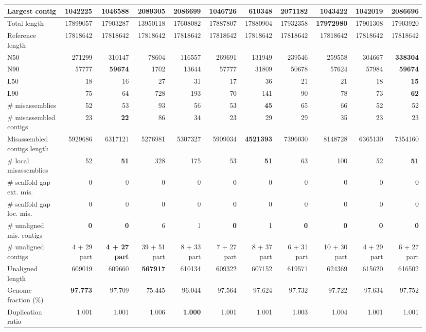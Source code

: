 \documentclass[12pt,a4paper]{article}
\begin{document}
\begin{table}[ht]
\begin{center}
\begin{tabular}{|l*{10}{|r}|}
Largest contig & 1042225 & 1046588 & {\bf 2089305} & 2086699 & 1046726 & 610348 & 2071182 & 1043422 & 1042019 & 2086696 \\ \hline
Total length & 17899057 & 17903287 & 13950118 & 17608082 & 17887807 & 17880904 & 17932358 & {\bf 17972980} & 17901308 & 17903920 \\ \hline
Reference length & 17818642 & 17818642 & 17818642 & 17818642 & 17818642 & 17818642 & 17818642 & 17818642 & 17818642 & 17818642 \\ \hline
N50 & 271299 & 310147 & 78604 & 116557 & 269691 & 131949 & 239546 & 259558 & 304667 & {\bf 338304} \\ \hline
N90 & 57777 & {\bf 59674} & 1702 & 13644 & 57777 & 31809 & 50678 & 57624 & 57984 & {\bf 59674} \\ \hline
L50 & 18 & 16 & 27 & 31 & 17 & 36 & 21 & 21 & 18 & {\bf 15} \\ \hline
L90 & 75 & 64 & 728 & 193 & 70 & 141 & 90 & 78 & 73 & {\bf 62} \\ \hline
\# misassemblies & 52 & 53 & 93 & 56 & 53 & {\bf 45} & 65 & 66 & 52 & 52 \\ \hline
\# misassembled contigs & 23 & {\bf 22} & 86 & 34 & 23 & 29 & 29 & 35 & 23 & 23 \\ \hline
Misassembled contigs length & 5929686 & 6317121 & 5276981 & 5307327 & 5909034 & {\bf 4521393} & 7396030 & 8148728 & 6365130 & 7354160 \\ \hline
\# local misassemblies & 52 & {\bf 51} & 328 & 175 & 53 & {\bf 51} & 63 & 100 & 52 & {\bf 51} \\ \hline
\# scaffold gap ext. mis. & 0 & 0 & 0 & 0 & 0 & 0 & 0 & 0 & 0 & 0 \\ \hline
\# scaffold gap loc. mis. & 0 & 0 & 0 & 0 & 0 & 0 & 0 & 0 & 0 & 0 \\ \hline
\# unaligned mis. contigs & {\bf 0} & {\bf 0} & 6 & 1 & {\bf 0} & 1 & {\bf 0} & {\bf 0} & {\bf 0} & {\bf 0} \\ \hline
\# unaligned contigs & 4 + 29 part & {\bf 4 + 27 part} & 39 + 51 part & 8 + 33 part & 7 + 27 part & 8 + 37 part & 6 + 31 part & 10 + 30 part & 4 + 29 part & 6 + 27 part \\ \hline
Unaligned length & 609019 & 609660 & {\bf 567917} & 610134 & 609322 & 607152 & 619571 & 624369 & 615620 & 616502 \\ \hline
Genome fraction (\%) & {\bf 97.773} & 97.709 & 75.445 & 96.044 & 97.564 & 97.624 & 97.732 & 97.722 & 97.634 & 97.752 \\ \hline
Duplication ratio & 1.001 & 1.001 & 1.006 & {\bf 1.000} & 1.001 & 1.001 & 1.003 & 1.004 & 1.001 & 1.001 \\ \hline

\end{tabular}
\end{center}
\end{table}
\end{document}
